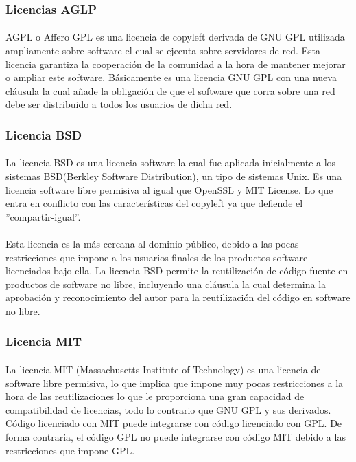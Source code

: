 \documentclass[10pt]{article}
\begin{document}
		\subsubsection{Licencias AGLP}
        	\paragraph{}
             AGPL o Affero GPL es una licencia de copyleft derivada de GNU GPL utilizada ampliamente sobre software el cual se ejecuta sobre servidores de red. Esta licencia garantiza la cooperación de la comunidad a la hora de mantener mejorar o ampliar este software. Básicamente es una licencia GNU GPL con una nueva cláusula la cual añade la obligación de que el software que corra sobre una red debe ser distribuido a todos los usuarios de dicha red.
             
        \subsubsection{Licencia BSD}
        	\paragraph{}
            La licencia BSD es una licencia software la cual fue aplicada inicialmente a los sistemas BSD(Berkley Software Distribution), un tipo de sistemas Unix. Es una licencia software libre permisiva al igual que OpenSSL y MIT License. Lo que entra en conflicto con las características del copyleft ya que defiende el ''compartir-igual''.
            
            \paragraph{}
            Esta licencia es la más cercana al dominio público, debido a las pocas restricciones que impone a los usuarios finales de los productos software licenciados bajo ella. La licencia BSD permite la reutilización de código fuente en productos de software no libre, incluyendo una cláusula la cual determina la aprobación y reconocimiento del autor para la reutilización del código en software no libre.
             
  		\subsubsection{Licencia MIT}
        	\paragraph{}
             La licencia MIT (Massachusetts Institute of Technology) es una licencia de software libre permisiva, lo que implica que impone muy pocas restricciones a la hora de las reutilizaciones lo que le proporciona una gran capacidad de compatibilidad de licencias, todo lo contrario que GNU GPL y sus derivados. Código licenciado con MIT puede integrarse con código licenciado con GPL. De forma contraria, el código GPL no puede integrarse con código MIT debido a las restricciones que impone GPL.
             
\end{document}
